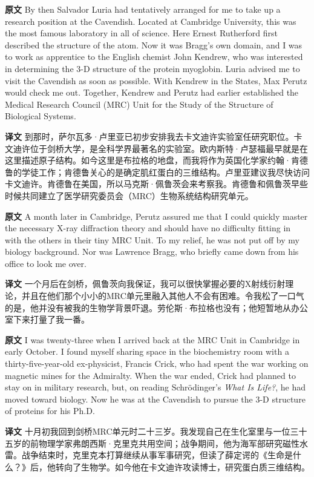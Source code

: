 \documentclass[UTF8,zihao=-4]{ctexart}
\newcommand{\BodyFont}{\fontsize{10.5pt}{15.5pt}\selectfont}
\renewenvironment{quote}{\par\noindent\begingroup\BodyFont}{\par\endgroup}
\begin{document}
\begin{quote}
\noindent\textbf{原文} By then Salvador Luria had tentatively arranged for me to take up a research position at the Cavendish. Located at Cambridge University, this was the most famous laboratory in all of science. Here Ernest Rutherford first described the structure of the atom. Now it was Bragg's own domain, and I was to work as apprentice to the English chemist John Kendrew, who was interested in determining the 3-D structure of the protein myoglobin. Luria advised me to visit the Cavendish as soon as possible. With Kendrew in the States, Max Perutz would check me out. Together, Kendrew and Perutz had earlier established the Medical Research Council (MRC) Unit for the Study of the Structure of Biological Systems.

\smallskip
\noindent\textbf{译文} 到那时，萨尔瓦多·卢里亚已初步安排我去卡文迪许实验室任研究职位。卡文迪许位于剑桥大学，是全科学界最著名的实验室。欧内斯特·卢瑟福最早就是在这里描述原子结构。如今这里是布拉格的地盘，而我将作为英国化学家约翰·肯德鲁的学徒工作；肯德鲁关心的是确定肌红蛋白的三维结构。卢里亚建议我尽快访问卡文迪许。肯德鲁在美国，所以马克斯·佩鲁茨会来考察我。肯德鲁和佩鲁茨早些时候共同建立了医学研究委员会（MRC）生物系统结构研究单元。
\end{quote}

\begin{quote}
\noindent\textbf{原文} A month later in Cambridge, Perutz assured me that I could quickly master the necessary X-ray diffraction theory and should have no difficulty fitting in with the others in their tiny MRC Unit. To my relief, he was not put off by my biology background. Nor was Lawrence Bragg, who briefly came down from his office to look me over.

\smallskip
\noindent\textbf{译文} 一个月后在剑桥，佩鲁茨向我保证，我可以很快掌握必要的X射线衍射理论，并且在他们那个小小的MRC单元里融入其他人不会有困难。令我松了一口气的是，他并没有被我的生物学背景吓退。劳伦斯·布拉格也没有；他短暂地从办公室下来打量了我一番。
\end{quote}

\begin{quote}
\noindent\textbf{原文} I was twenty-three when I arrived back at the MRC Unit in Cambridge in early October. I found myself sharing space in the biochemistry room with a thirty-five-year-old ex-physicist, Francis Crick, who had spent the war working on magnetic mines for the Admiralty. When the war ended, Crick had planned to stay on in military research, but, on reading Schrödinger's \emph{What Is Life?}, he had moved toward biology. Now he was at the Cavendish to pursue the 3-D structure of proteins for his Ph.D.

\smallskip
\noindent\textbf{译文} 十月初我回到剑桥MRC单元时二十三岁。我发现自己在生化室里与一位三十五岁的前物理学家弗朗西斯·克里克共用空间；战争期间，他为海军部研究磁性水雷。战争结束时，克里克本打算继续从事军事研究，但读了薛定谔的《生命是什么？》后，他转向了生物学。如今他在卡文迪许攻读博士，研究蛋白质三维结构。
\end{quote}
\end{document}
